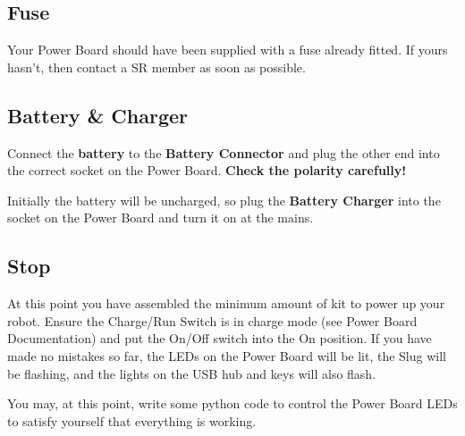 \subsection{Fuse}
Your Power Board should have been supplied with a fuse already fitted. If yours hasn't, then contact a SR member as soon as possible.

\subsection{Battery \& Charger}
Connect the {\bf battery} to the {\bf Battery Connector} and plug the other end into the correct socket on the Power Board. {\bf Check the polarity carefully!}

Initially the battery will be uncharged, so plug the {\bf Battery Charger} into the socket on the Power Board and turn it on at the mains.


\subsection{Stop}
At this point you have assembled the minimum amount of kit to power up your robot. Ensure the Charge/Run Switch is in charge mode (see Power Board Documentation) and put the On/Off switch into the On position. If you have made no mistakes so far, the LEDs on the Power Board will be lit, the Slug will be flashing, and the lights on the USB hub and keys will also flash.

You may, at this point, write some python code to control the Power Board LEDs to satisfy yourself that everything is working.

